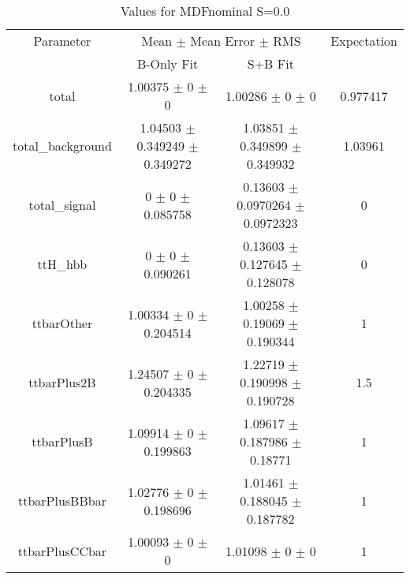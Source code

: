 \begin{table}
\centering
\caption{Values for MDFnominal S=0.0}
\begin{tabular}{cccc}
\toprule
Parameter & \multicolumn{2}{c}{Mean $\pm$ Mean Error $\pm$ RMS} & Expectation\\
 & B-Only Fit & S+B Fit & \\
\midrule
total & \num{1.00375} $\pm$ \num{0} $\pm$ \num{0} & \num{1.00286} $\pm$ \num{0} $\pm$ \num{0} & \num{0.977417}\\
total\_background & \num{1.04503} $\pm$ \num{0.349249} $\pm$ \num{0.349272} & \num{1.03851} $\pm$ \num{0.349899} $\pm$ \num{0.349932} & \num{1.03961}\\
total\_signal & \num{0} $\pm$ \num{0} $\pm$ \num{0.085758} & \num{0.13603} $\pm$ \num{0.0970264} $\pm$ \num{0.0972323} & \num{0}\\
ttH\_hbb & \num{0} $\pm$ \num{0} $\pm$ \num{0.090261} & \num{0.13603} $\pm$ \num{0.127645} $\pm$ \num{0.128078} & \num{0}\\
ttbarOther & \num{1.00334} $\pm$ \num{0} $\pm$ \num{0.204514} & \num{1.00258} $\pm$ \num{0.19069} $\pm$ \num{0.190344} & \num{1}\\
ttbarPlus2B & \num{1.24507} $\pm$ \num{0} $\pm$ \num{0.204335} & \num{1.22719} $\pm$ \num{0.190998} $\pm$ \num{0.190728} & \num{1.5}\\
ttbarPlusB & \num{1.09914} $\pm$ \num{0} $\pm$ \num{0.199863} & \num{1.09617} $\pm$ \num{0.187986} $\pm$ \num{0.18771} & \num{1}\\
ttbarPlusBBbar & \num{1.02776} $\pm$ \num{0} $\pm$ \num{0.198696} & \num{1.01461} $\pm$ \num{0.188045} $\pm$ \num{0.187782} & \num{1}\\
ttbarPlusCCbar & \num{1.00093} $\pm$ \num{0} $\pm$ \num{0} & \num{1.01098} $\pm$ \num{0} $\pm$ \num{0} & \num{1}\\
\bottomrule
\end{tabular}
\end{table}